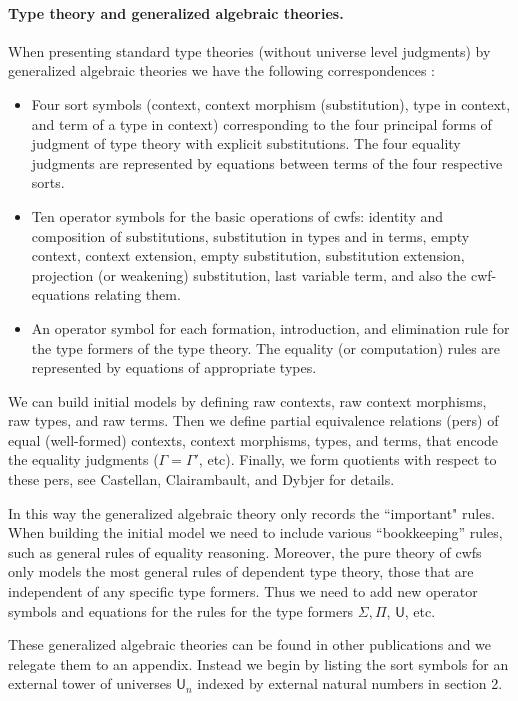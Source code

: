 \documentclass[11pt,a4paper]{article}
\theoremstyle{definition}
\newcommand{\UU}{\mathsf{U}}
\def\UU{\mathsf{U}}
\begin{document}
\paragraph{Type theory and generalized algebraic theories.} When presenting standard type theories (without universe level judgments) by generalized algebraic theories we have the following correspondences \cite{bezem:hofmann}:
\begin{itemize}
\item Four sort symbols (context, context morphism (substitution), type in context, and term of a type in context) corresponding to the four principal forms of judgment of type theory with explicit substitutions. The four equality judgments are represented by equations between terms of the four respective sorts.
\item Ten operator symbols for the basic operations of cwfs: identity and composition of substitutions, substitution in types and in terms, empty context, context extension, empty substitution, substitution extension, projection (or weakening) substitution, last variable term, and also the cwf-equations relating them.
\item An operator symbol for each formation, introduction, and elimination rule for the type formers of the type theory. The equality (or computation) rules are represented by equations of appropriate types.
\end{itemize}

We can build initial models by defining raw contexts, raw context morphisms, raw types, and raw terms. Then we 
define partial equivalence relations (pers) of equal (well-formed) contexts,  context morphisms, types, and terms, that encode the equality judgments ($\Gamma = \Gamma'$, etc). Finally, we form quotients with respect to these pers, see Castellan, Clairambault, and Dybjer \cite{castellan:warsaw,CCD:lambek} for details.

In this way the generalized algebraic theory only records the ``important" rules. When building the initial model we need to include various ``bookkeeping'' rules, such as general rules of equality reasoning. Moreover, the pure theory of cwfs only models the most general rules of dependent type theory, those that are independent of any specific type formers. Thus we need to add new operator symbols and equations for the rules for the type formers $\Sigma, \Pi$, $\UU$, etc.

These generalized algebraic theories can be found in other publications \cite{dybjer:torino, bezem:hofmann} and we relegate them to an appendix. Instead we begin by listing the sort symbols for an external tower of universes $\UU_n$ indexed by external natural numbers in section 2.
\end{document}
